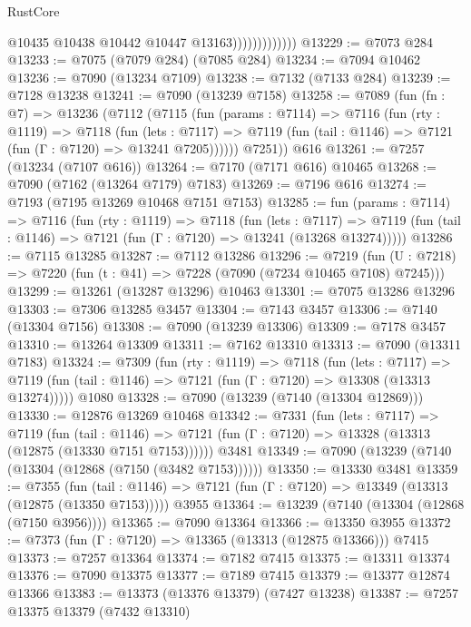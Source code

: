 \begin{lexlean}{RustCore}
\begin{coremodule}
                              @10435
                              @10438
                              @10442
                              @10447
                              @13163)))))))))))))
@13229 := @7073 @284
@13233 := @7075 (@7079 @284) (@7085 @284)
@13234 := @7094 @10462
@13236 := @7090 (@13234 @7109)
@13238 := @7132 (@7133 @284)
@13239 := @7128 @13238
@13241 := @7090 (@13239 @7158)
@13258 := @7089
    (fun (fn : @7) =>
    @13236
      (@7112
        (@7115
          (fun (params : @7114) =>
          @7116
            (fun (rty : @1119) =>
            @7118
              (fun (lets : @7117) =>
              @7119 (fun (tail : @1146) => @7121 (fun (Γ : @7120) => @13241 @7205))))))
        @7251))
    @616
@13261 := @7257 (@13234 (@7107 @616))
@13264 := @7170 (@7171 @616) @10465
@13268 := @7090 (@7162 (@13264 @7179) @7183)
@13269 := @7196 @616
@13274 := @7193 (@7195 @13269 @10468 @7151 @7153)
@13285 := fun (params : @7114) =>
  @7116
    (fun (rty : @1119) =>
    @7118
      (fun (lets : @7117) =>
      @7119 (fun (tail : @1146) => @7121 (fun (Γ : @7120) => @13241 (@13268 @13274)))))
@13286 := @7115 @13285
@13287 := @7112 @13286
@13296 := @7219
    (fun (U : @7218) => @7220 (fun (t : @41) => @7228 (@7090 (@7234 @10465 @7108) @7245)))
@13299 := @13261 (@13287 @13296) @10463
@13301 := @7075 @13286 @13296
@13303 := @7306 @13285 @3457
@13304 := @7143 @3457
@13306 := @7140 (@13304 @7156)
@13308 := @7090 (@13239 @13306)
@13309 := @7178 @3457
@13310 := @13264 @13309
@13311 := @7162 @13310
@13313 := @7090 (@13311 @7183)
@13324 := @7309
    (fun (rty : @1119) =>
    @7118
      (fun (lets : @7117) =>
      @7119 (fun (tail : @1146) => @7121 (fun (Γ : @7120) => @13308 (@13313 @13274)))))
    @1080
@13328 := @7090 (@13239 (@7140 (@13304 @12869)))
@13330 := @12876 @13269 @10468
@13342 := @7331
    (fun (lets : @7117) =>
    @7119
      (fun (tail : @1146) =>
      @7121 (fun (Γ : @7120) => @13328 (@13313 (@12875 (@13330 @7151 @7153))))))
    @3481
@13349 := @7090 (@13239 (@7140 (@13304 (@12868 (@7150 (@3482 @7153))))))
@13350 := @13330 @3481
@13359 := @7355
    (fun (tail : @1146) => @7121 (fun (Γ : @7120) => @13349 (@13313 (@12875 (@13350 @7153)))))
    @3955
@13364 := @13239 (@7140 (@13304 (@12868 (@7150 @3956))))
@13365 := @7090 @13364
@13366 := @13350 @3955
@13372 := @7373 (fun (Γ : @7120) => @13365 (@13313 (@12875 @13366))) @7415
@13373 := @7257 @13364
@13374 := @7182 @7415
@13375 := @13311 @13374
@13376 := @7090 @13375
@13377 := @7189 @7415
@13379 := @13377 @12874 @13366
@13383 := @13373 (@13376 @13379) (@7427 @13238)
@13387 := @7257 @13375 @13379 (@7432 @13310)

\end{coremodule}
\end{lexlean}
